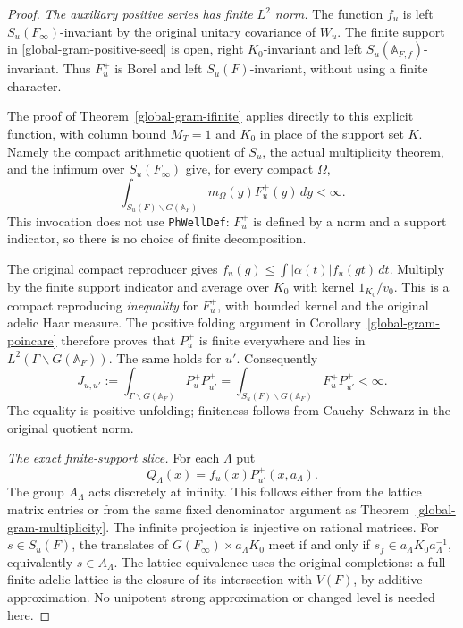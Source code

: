 \begin{proof}
\emph{The auxiliary positive series has finite $L^2$ norm.}
The function $f_u$ is left $S_u(F_\infty)$-invariant by the original
unitary covariance of $W_u$.  The finite support in
\eqref{global-gram-positive-seed} is open, right $K_0$-invariant
and left $S_u(\mathbb A_{F,f})$-invariant.  Thus $F_u^+$ is Borel
and left $S_u(F)$-invariant, without using a finite character.

The proof of Theorem~\ref{global-gram-ifinite} applies directly
to this explicit function, with column bound $M_T=1$ and $K_0$
in place of the support set $K$.  Namely the compact arithmetic
quotient of $S_u$, the actual multiplicity theorem, and the
infimum over $S_u(F_\infty)$ give, for every compact $\Omega$,
\[
 \int_{S_u(F)\backslash G(\mathbb A_F)}
                  m_\Omega(y)F_u^+(y)\,dy<\infty.
\]
This invocation does not use \texttt{PhWellDef}: $F_u^+$ is
defined by a norm and a support indicator, so there is no
choice of finite decomposition.

The original compact reproducer gives
$f_u(g)\le\int|\alpha(t)|f_u(gt)\,dt$.
Multiply by the finite support indicator and average over $K_0$
with kernel $1_{K_0}/v_0$.  This is a compact reproducing
\emph{inequality} for $F_u^+$, with bounded kernel and the original
adelic Haar measure.  The positive folding argument in
Corollary~\ref{global-gram-poincare} therefore proves that $P_u^+$
is finite everywhere and lies in $L^2(\Gamma\backslash G(\mathbb A_F))$.
The same holds for $u'$.  Consequently
\begin{equation}\label{global-gram-positive-J}
 J_{u,u'}:=\int_{\Gamma\backslash G(\mathbb A_F)}P_u^+P_{u'}^+
   =\int_{S_u(F)\backslash G(\mathbb A_F)}F_u^+P_{u'}^+
   <\infty.
\end{equation}
The equality is positive unfolding; finiteness follows from
Cauchy--Schwarz in the original quotient norm.

\emph{The exact finite-support slice.}
For each $\Lambda$ put
\[
 Q_\Lambda(x)=f_u(x)P_{u'}^+(x,a_\Lambda).
\]
The group $A_\Lambda$ acts discretely at infinity.  This follows
either from the lattice matrix entries or from the same fixed
denominator argument as Theorem~\ref{global-gram-multiplicity}.
The infinite projection is injective on rational matrices.
For $s\in S_u(F)$, the translates of
$G(F_\infty)\times a_\Lambda K_0$ meet if and only if
$s_f\in a_\Lambda K_0a_\Lambda^{-1}$, equivalently
$s\in A_\Lambda$.
The lattice equivalence uses the original completions:
a full finite adelic lattice is the closure of its intersection
with $V(F)$, by additive approximation.  No unipotent strong
approximation or changed level is needed here.


\end{proof}
